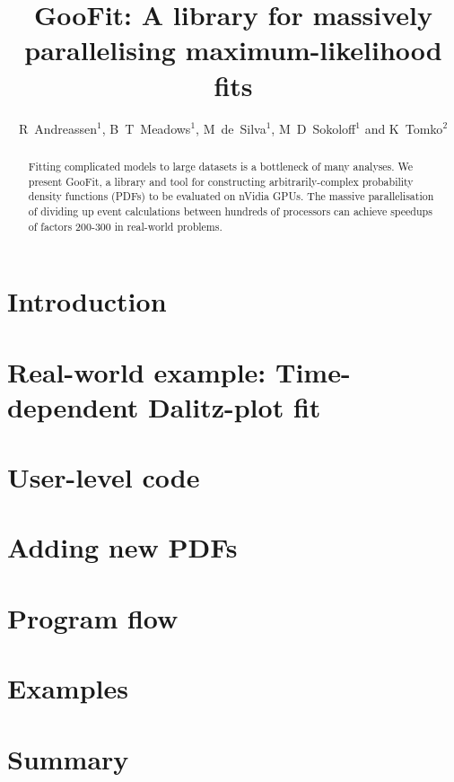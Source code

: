 \documentclass[a4paper]{jpconf}
\begin{document}
\title{GooFit: A library for massively parallelising maximum-likelihood fits}

\author{R~Andreassen$^1$, B~T~Meadows$^1$, M~de~Silva$^1$, M~D~Sokoloff$^1$ and K~Tomko$^2$}
\address{$^1$ University of Cincinnati, 2600 Clifton Avenue, Cincinnati OH 45220, USA}
\address{$^2$ Ohio Supercomputer Center, 1224 Kinnear Road, Columbus OH 43212, USA}

\begin{abstract}
Fitting complicated models to large datasets is a bottleneck of
many analyses. We present GooFit, a library and tool for constructing
arbitrarily-complex probability density functions (PDFs) to be evaluated
on nVidia GPUs. The massive parallelisation of dividing up event calculations 
between hundreds of processors can achieve speedups of factors 200-300 in
real-world problems. 
\end{abstract} 

\section{Introduction}



\section{Real-world example: Time-dependent Dalitz-plot fit}

\section{User-level code}

\section{Adding new PDFs}

\section{Program flow}

\section{Examples}

\section{Summary}
\end{document}
